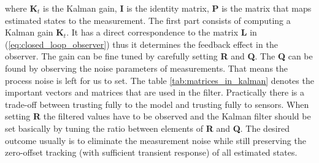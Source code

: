where $\textbf{K}_t$ is the Kalman gain, $\mathbf{I}$ is the identity matrix, \textbf{P} is the matrix that maps estimated states to the measurement. The first part consists of computing a Kalman gain $\textbf{K}_t$. It has a direct correspondence to the matrix \textbf{L} in (\ref{eq:closed_loop_observer}) thus it determines the feedback effect in the observer. The gain can be fine tuned by carefully setting \textbf{R} and \textbf{Q}. The \textbf{Q} can be found by observing the noise parameters of measurements. That means the process noise is left for us to set. The table \ref{tab:matrices_in_kalman} denotes the important vectors and matrices that are used in the filter. Practically there is a trade-off between trusting fully to the model and trusting fully to sensors. When setting \textbf{R} the filtered values have to be observed and the Kalman filter should be set basically by tuning the ratio between elements of \textbf{R} and \textbf{Q}. The desired outcome usually is to eliminate the measurement noise while still preserving the zero-offset tracking (with sufficient transient response) of all estimated states.

